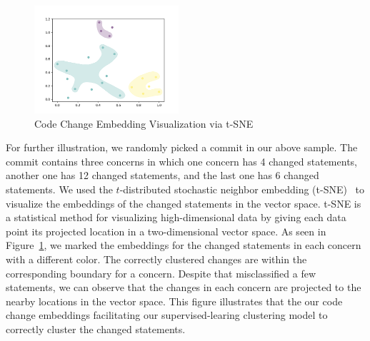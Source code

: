 
\begin{figure}[t]
	\centering
	\includegraphics[width=2.1in]{figures/RQ5.png}
	\vspace{-18pt}
	\caption{Code Change Embedding Visualization via t-SNE}
	\label{fig:vis}
\end{figure}

For further illustration, we randomly picked a commit in our above
sample. The commit contains three concerns in which one concern has 4
changed statements, another one has 12 changed statements, and the
last one has 6 changed statements. We used the $t$-distributed
stochastic neighbor embedding (t-SNE)~\cite{tsne} to visualize the
embeddings of the changed statements in the vector space. t-SNE is a
statistical method for visualizing high-dimensional data by giving
each data point its projected location in a two-dimensional vector
space. As seen in Figure~\ref{fig:vis}, we marked the embeddings for
the changed statements in each concern with a different color. The
correctly clustered changes are within the corresponding boundary for
a concern. Despite that {\tool} misclassified a few statements,
we can observe that the changes in each concern are projected to the
nearby locations in the vector space. This figure illustrates that the
our code change embeddings facilitating our supervised-learing
clustering model to correctly cluster the changed statements.




